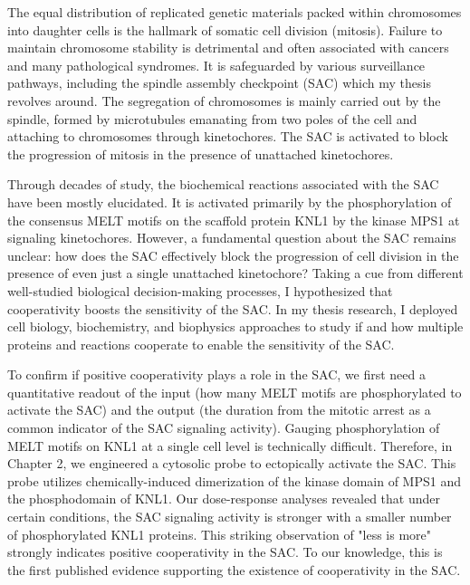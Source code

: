 The equal distribution of replicated genetic materials packed within chromosomes into daughter cells is the hallmark of somatic cell division (mitosis). Failure to maintain chromosome stability is detrimental and often associated with cancers and many pathological syndromes. It is safeguarded by various surveillance pathways, including the spindle assembly checkpoint (SAC) which my thesis revolves around. The segregation of chromosomes is mainly carried out by the spindle, formed by microtubules emanating from two poles of the cell and attaching to chromosomes through kinetochores. The SAC is activated to block the progression of mitosis in the presence of unattached kinetochores.

Through decades of study, the biochemical reactions associated with the SAC have been mostly elucidated. It is activated primarily by the phosphorylation of the consensus MELT motifs on the scaffold protein KNL1 by the kinase MPS1 at signaling kinetochores. However, a fundamental question about the SAC remains unclear: how does the SAC effectively block the progression of cell division in the presence of even just a single unattached kinetochore? Taking a cue from different well-studied biological decision-making processes, I hypothesized that cooperativity boosts the sensitivity of the SAC. In my thesis research, I deployed cell biology, biochemistry, and biophysics approaches to study if and how multiple proteins and reactions cooperate to enable the sensitivity of the SAC.

To confirm if positive cooperativity plays a role in the SAC, we first need a quantitative readout of the input (how many MELT motifs are phosphorylated to activate the SAC) and the output (the duration from the mitotic arrest as a common indicator of the SAC signaling activity). Gauging phosphorylation of MELT motifs on KNL1 at a single cell level is technically difficult. Therefore, in Chapter 2, we engineered a cytosolic probe to ectopically activate the SAC. This probe utilizes chemically-induced dimerization of the kinase domain of MPS1 and the phosphodomain of KNL1. Our dose-response analyses revealed that under certain conditions, the SAC signaling activity is stronger with a smaller number of phosphorylated KNL1 proteins. This striking observation of "less is more" strongly indicates positive cooperativity in the SAC. To our knowledge, this is the first published evidence supporting the existence of cooperativity in the SAC.

